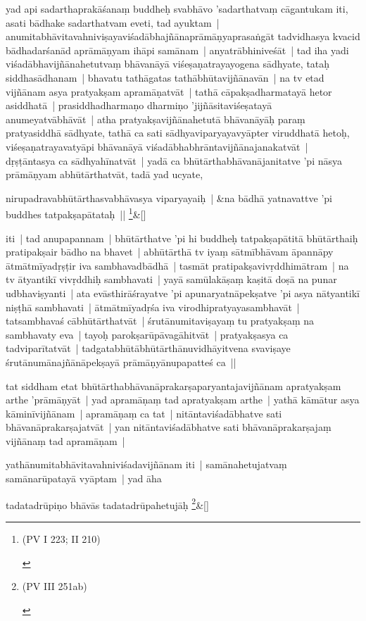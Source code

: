 \documentclass[article,12pt,a4paper]{memoir}
\begin{document}
	  \pstart yad api sadarthaprakāśanaṃ buddheḥ svabhāvo 'sadarthatvaṃ cāgantukam iti, asati bādhake sadarthatvam eveti, tad ayuktam | anumitabhāvitavahniviṣayaviśadābhajñānaprāmāṇyaprasaṅgāt tadvidhasya kvacid bādhadarśanād aprāmāṇyam ihāpi samānam | anyatrābhiniveśāt | tad iha yadi viśadābhavijñānahetutvaṃ bhāvanāyā viśeṣaṇatrayayogena sādhyate, tataḥ siddhasādhanam | bhavatu tathāgatas tathābhūtavijñānavān | na tv etad vijñānam asya pratyakṣam apramāṇatvāt | tathā cāpakṣadharmatayā hetor asiddhatā | prasiddhadharmaṇo dharmiṇo 'jijñāsitaviśeṣatayā anumeyatvābhāvāt | atha pratyakṣavijñānahetutā bhāvanāyāḥ paraṃ pratyasiddhā sādhyate, tathā ca sati sādhyaviparyayavyāpter viruddhatā hetoḥ, viśeṣaṇatrayavatyāpi bhāvanāyā viśadābhabhrāntavijñānajanakatvāt | dṛṣṭāntasya ca sādhyahīnatvāt | yadā ca bhūtārthabhāvanājanitatve 'pi nāsya prāmāṇyam abhūtārthatvāt, tadā yad ucyate, 
	\pend
      
	    
	    \stanza[\smallbreak]
	nirupadravabhūtārthasvabhāvasya viparyayaiḥ | &na bādhā yatnavattve 'pi buddhes tatpakṣapātataḥ || \footnote{\begin{english}(PV I 223; II 210)\end{english}}\&[\smallbreak]


	

	  \pstart iti | tad anupapannam | bhūtārthatve 'pi hi buddheḥ tatpakṣapātitā bhūtārthaiḥ pratipakṣair bādho na bhavet | abhūtārthā tv iyaṃ sātmībhāvam āpannāpy ātmātmīyadṛṣṭir iva sambhavadbādhā | tasmāt pratipakṣavivṛddhimātram | na tv ātyantikī vivṛddhiḥ sambhavati | yayā samūlakāṣaṃ kaṣitā doṣā na punar udbhaviṣyanti | ata evāsthirāśrayatve 'pi apunaryatnāpekṣatve 'pi asya nātyantikī niṣṭhā sambhavati | ātmātmīyadṛśa iva virodhipratyayasambhavāt | tatsambhavaś cābhūtārthatvāt | śrutānumitaviṣayaṃ tu pratyakṣaṃ na sambhavaty eva | tayoḥ parokṣarūpāvagāhitvāt | pratyakṣasya ca tadviparītatvāt | tadgatabhūtābhūtārthānuvidhāyitvena svaviṣaye śrutānumānajñānāpekṣayā prāmāṇyānupapatteś ca || 
	\pend
      

	  \pstart tat siddham etat bhūtārthabhāvanāprakarṣaparyantajavijñānam apratyakṣam arthe 'prāmāṇyāt | yad apramāṇaṃ tad apratyakṣam arthe | yathā kāmātur asya kāminīvijñānam | apramāṇaṃ ca tat | nitāntaviśadābhatve sati bhāvanāprakarṣajatvāt | yan nitāntaviśadābhatve sati bhāvanāprakarṣajaṃ vijñānaṃ tad apramāṇam | 
	\pend
      

	  \pstart yathānumitabhāvitavahniviśadavijñānam iti | samānahetujatvaṃ samānarūpatayā vyāptam | yad āha 
	\pend
      
	    
	    \stanza[\smallbreak]
	tadatadrūpiṇo bhāvās tadatadrūpahetujāḥ \footnote{\begin{english}(PV III 251ab)\end{english}}\&[\smallbreak]
\end{document}
